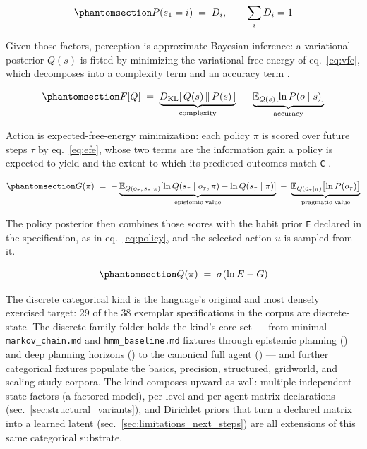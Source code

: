 \documentclass[
  english,
  9pt,
]{extarticle}
\begin{document}
\begin{equation}\protect\phantomsection\label{eq:prior}{
P(s_1 = i) \;=\; D_i, \qquad \sum_i D_i = 1
}\end{equation}

Given those factors, perception is approximate Bayesian inference: a
variational posterior \(Q(s)\) is fitted by minimizing the variational
free energy of eq.~\ref{eq:vfe}, which decomposes into a complexity term
and an accuracy term \citep{friston2010}.

\begin{equation}\protect\phantomsection\label{eq:vfe}{
F[Q] \;=\; \underbrace{D_{\mathrm{KL}}\!\left[\,Q(s) \,\|\, P(s)\,\right]}_{\text{complexity}} \;-\; \underbrace{\mathbb{E}_{Q(s)}\!\left[\ln P(o \mid s)\right]}_{\text{accuracy}}
}\end{equation}

Action is expected-free-energy minimization: each policy \(\pi\) is
scored over future steps \(\tau\) by eq.~\ref{eq:efe}, whose two terms
are the information gain a policy is expected to yield and the extent to
which its predicted outcomes match \texttt{C} \citep{dacosta2020}.

\begin{equation}\protect\phantomsection\label{eq:efe}{
G(\pi) \;=\; -\underbrace{\mathbb{E}_{Q(o_\tau,\, s_\tau \mid \pi)}\!\left[\ln Q(s_\tau \mid o_\tau, \pi) - \ln Q(s_\tau \mid \pi)\right]}_{\text{epistemic value}} \;-\; \underbrace{\mathbb{E}_{Q(o_\tau \mid \pi)}\!\left[\ln \tilde{P}(o_\tau)\right]}_{\text{pragmatic value}}
}\end{equation}

The policy posterior then combines those scores with the habit prior
\texttt{E} declared in the specification, as in eq.~\ref{eq:policy}, and
the selected action \(u\) is sampled from it.

\begin{equation}\protect\phantomsection\label{eq:policy}{
Q(\pi) \;=\; \sigma\!\left(\ln E - G\right)
}\end{equation}

The discrete categorical kind is the language's original and most
densely exercised target: 29 of the 38 exemplar specifications in the
corpus are discrete-state. The discrete family folder holds the kind's
core set --- from minimal \texttt{markov\_chain.md} and
\texttt{hmm\_baseline.md} fixtures through epistemic planning
() and deep planning horizons
() to the canonical full agent
() --- and further categorical fixtures
populate the basics, precision, structured, gridworld, and scaling-study
corpora. The kind composes upward as well: multiple independent state
factors (a factored model), per-level and per-agent matrix declarations
(sec.~\ref{sec:structural_variants}), and Dirichlet priors that turn a
declared matrix into a learned latent
(sec.~\ref{sec:limitations_next_steps}) are all extensions of this same
categorical substrate.
\end{document}
